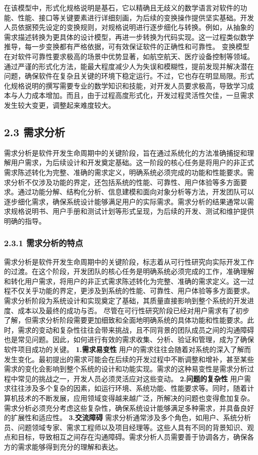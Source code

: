 在该模型中，形式化规格说明是基石，它以精确且无歧义的数学语言对软件的功能、性能、接口等关键要素进行详细刻画，为后续的变换操作提供坚实基础。开发人员依据预先设定的变换规则，对规格说明进行逐步细化与转换。例如，从抽象的需求描述转换为更具体的设计模型，再进一步转换为代码实现。这一过程类似数学推导，每一步变换都有严格依据，可有效保证软件的正确性和可靠性。 变换模型在对软件可靠性要求极高的场景中优势显著，如航空航天、医疗设备控制等领域。通过严谨的形式化方法，能最大程度减少人为失误和模糊性，提前发现并解决潜在问题，确保软件在复杂且关键的环境下稳定运行。不过，它也存在明显局限。形式化规格说明的撰写需要专业的数学知识和技能，对开发人员要求极高，导致学习成本与人力成本增加。而且，由于过程高度形式化，开发过程灵活性欠佳，一旦需求发生较大变更，调整起来难度较大。

\subsection{2.3 需求分析}\label{ux9700ux6c42ux5206ux6790} 需求分析是软件开发生命周期中的关键阶段，旨在通过系统化的方法准确捕捉和理解用户需求，为后续设计和开发奠定基础。这一阶段的核心任务是将用户的非正式需求陈述转化为完整、准确的需求定义，明确系统必须完成的功能和性能要求。需求分析不仅涉及功能的界定，还包括系统的性能、可靠性、用户体验等多方面要求。通过功能分解、结构化分析、信息建模和面向对象分析等方法，开发团队可以逐步细化需求，确保系统设计能够满足用户的实际需求。需求分析的结果通常以需求规格说明书、用户手册和测试计划等形式呈现，为后续的开发、测试和维护提供明确的指导。 \subsubsection{2.3.1 需求分析的特点}\label{ux9700ux6c42ux5206ux6790ux7684ux7279ux70b9} 需求分析是软件开发生命周期中的关键阶段，标志着从可行性研究向实际开发工作的过渡。在这个阶段，开发团队的核心任务是明确系统必须完成的工作，准确理解和转化用户需求，将用户的非正式需求陈述转化为完整、准确的需求定义。这一过程不仅关乎功能的界定，更涉及到系统的性能、可靠性、用户体验等多方面要求。需求分析阶段为系统设计和实现奠定了基础，其质量直接影响到整个系统的开发进度、成本以及最终的成功与否。 尽管在可行性研究阶段已经对用户需求有了初步了解，但需求分析阶段需要更加细致和全面地明确系统的具体功能和性能要求。此时，需求的变动和复杂性往往会带来挑战，且不同背景的团队成员之间的沟通障碍也是常见问题。因此，如何进行有效的需求收集、分析、验证和管理，成为了确保软件项目成功的关键。 \textbf{1.需求易变性} 用户的需求往往会随着对系统的深入了解而发生变化。最初提出的需求可能会在后续的开发过程中不断调整和增补，甚至某些需求的变化会影响到整个系统的设计和功能实现。需求的这种易变性是需求分析过程中常见的挑战之一，开发人员必须灵活应对这些变动。 \textbf{2.问题的复杂性} 用户需求往往涉及多个复杂的因素，如运行环境、系统功能、性能要求等。同时，随着计算机技术的不断发展，应用领域变得越来越广泛，所解决的问题也变得愈加复杂。需求分析必须充分考虑这些复杂性，确保系统设计能够满足多种需求，并具备良好的扩展性和适应性。 \textbf{3.交流障碍} 需求分析通常涉及多个角色，如用户、系统分析员、问题领域专家、需求工程师以及项目经理等。这些人具有不同的背景知识、观点和目标，导致相互之间存在沟通障碍。需求分析人员需要善于协调各方，确保各方的需求能够得到充分的理解和表达。 